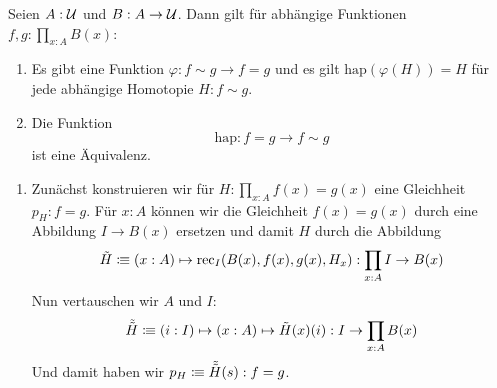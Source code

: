 \begin{theorem}
  Seien $A:\mathcal{U}$ und $B:A\to\mathcal{U}$. Dann gilt für abhängige Funktionen $f,g:\prod_{x:A}B(x)$:
  \begin{enumerate}
  \item Es gibt eine Funktion $\varphi:f\sim g \to f = g$ und es gilt $\mathrm{hap}(\varphi(H))=H$ für jede abhängige Homotopie $H:f\sim g$.
  \item Die Funktion
    \[
      \mathrm{hap} :f=g\to f\sim g
    \]
    ist eine Äquivalenz.
  \end{enumerate}
\end{theorem}
\begin{beweis}
  \begin{enumerate}
  \item   Zunächst konstruieren wir für $H:\prod_{x:A}f(x)=g(x)$ eine Gleichheit $p_H:f=g$.
  Für $x:A$ können wir die Gleichheit $f(x)=g(x)$ durch eine Abbildung $I\to B(x)$ ersetzen
  und damit $H$ durch die Abbildung
  \[
    \tilde{H}\vcentcolon\mspace{-1.2mu}\equiv (x:A)\mapsto \mathrm{rec}_{I}(B(x),f(x),g(x),H_x) : \prod_{x:A}I\to B(x)
  \]
  Nun vertauschen wir $A$ und $I$:
  \[
    \tilde{\tilde{H}}\vcentcolon\mspace{-1.2mu}\equiv (i:I)\mapsto (x:A)\mapsto \tilde{H}(x)(i) : I\to\prod_{x:A}B(x)
  \]
  Und damit haben wir $p_H\vcentcolon\mspace{-1.2mu}\equiv \tilde{\tilde{H}}(s) : f=g$.


\end{enumerate}
\end{beweis}
